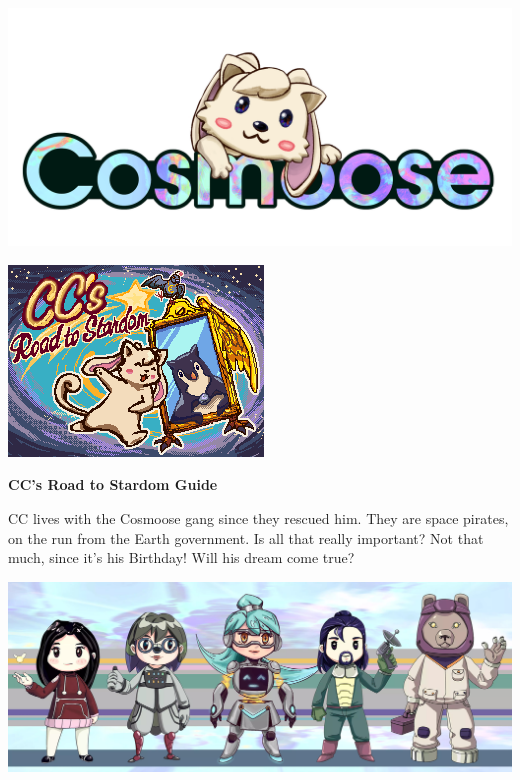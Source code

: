 \documentclass{article}
\newcommand{\bo}[1] {\textbf{#1}}
\newcommand{\bckg}[1]{\AddToShipoutPictureBG*{\texttt{[image: \#1]}}}
\begin{document}
\bckg{img/bg}
\begin{center}
    \includegraphics[height=.2\paperheight]{img/cclogo}

    \includegraphics[height=.5\paperheight]{img/loading}

    \vspace{.5cm}
    {\Huge \bo{CC's Road to Stardom Guide}}
\end{center}

\clearpage

\bckg{img/bg}

CC lives with the Cosmoose gang since they rescued him.
They are space pirates, on the run from the Earth government. Is all that really important?
Not that much, since it's his Birthday! Will his dream come true?

\begin{center}
    \includegraphics[height=.2\paperheight]{img/crew}
\end{center}
\end{document}
